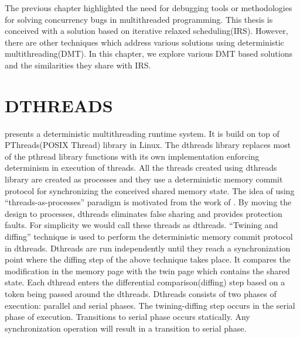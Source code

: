 The previous chapter highlighted the need for debugging tools or methodologies for solving concurrency bugs in multithreaded programming. 
This thesis is conceived with a solution based on iterative relaxed scheduling(IRS). 
However, there are other techniques which address various solutions using deterministic multithreading(DMT). 
In this chapter, we explore various DMT based solutions and the similarities they share with IRS. 

\section{DTHREADS}

\citet{dthreads} presents a deterministic multithreading runtime system. 
It is build on top of PThreads(POSIX Thread) library in Linux. 
The dthreads library replaces most of the pthread library functions with its own implementation enforcing determinism in execution of threads. 
All the threads created using dthreads library are created as processes and they use a deterministic memory commit protocol for synchronizing the conceived shared memory state. 
The idea of using ``threads-as-processes'' paradigm is motivated from the work of \citet{grace}. 
By moving the design to processes, dthreads eliminates false sharing and provides protection faults. 
For simplicity we would call these threads as dthreads. 
``Twining and diffing'' technique is used to perform the deterministic  memory commit protocol in dthreads. 
Dthreads are run independently until they reach a synchronization point where the diffing step of the above technique takes place. 
It compares the modification in the memory page with the twin page which contains the shared state. 
Each dthread enters the differential comparison(diffing) step based on a token being passed around the dthreads. 
Dthreads consists of two phases of execution: parallel and serial phases. 
The twining-diffing step occurs in the serial phase of execution. 
Transitions to serial phase occurs statically. 
Any synchronization operation will result in a transition to serial phase. 

